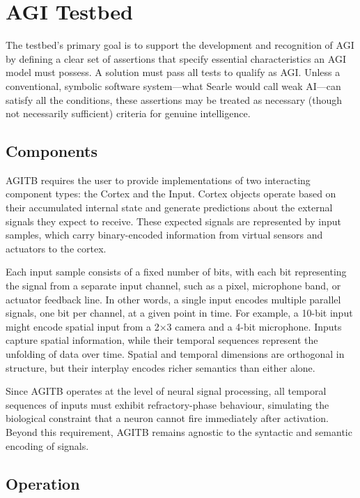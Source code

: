 \documentclass{article}
\begin{document}
\section{AGI Testbed}

The testbed's primary goal is to support the development and recognition of AGI by defining a clear set of assertions that specify essential characteristics an AGI model must possess. A solution must pass all tests to qualify as AGI. Unless a conventional, symbolic software system—what Searle \cite{Searle1980} would call weak AI—can satisfy all the conditions, these assertions may be treated as necessary (though not necessarily sufficient) criteria for genuine intelligence.

\subsection{Components}
AGITB requires the user to provide implementations of two interacting component types: the Cortex and the Input. Cortex objects operate based on their accumulated internal state and generate predictions about the external signals they expect to receive. These expected signals are represented by input samples, which carry binary-encoded information from virtual sensors and actuators to the cortex.

Each input sample consists of a fixed number of bits, with each bit representing the signal from a separate input channel, such as a pixel, microphone band, or actuator feedback line. In other words, a single input encodes multiple parallel signals, one bit per channel, at a given point in time. For example, a 10-bit input might encode spatial input from a 2×3 camera and a 4-bit microphone. Inputs capture spatial information, while their temporal sequences represent the unfolding of data over time. Spatial and temporal dimensions are orthogonal in structure, but their interplay encodes richer semantics than either alone. 

Since AGITB operates at the level of neural signal processing, all temporal sequences of inputs must exhibit refractory-phase behaviour, simulating the biological constraint that a neuron cannot fire immediately after activation. Beyond this requirement, AGITB remains agnostic to the syntactic and semantic encoding of signals. 

\subsection{Operation}
\end{document}
